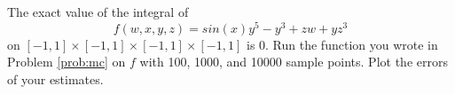 \begin{problem}
\label{prob:mc_test}
The exact value of the integral of
\[
f(w,x,y,z) = sin(x) y^5 -y^3 + zw + yz^3
\]
on $[-1,1]\times[-1,1]\times[-1,1]\times[-1,1]$ is 0.
Run the function  you wrote in Problem \ref{prob:mc} on $f$ with 100, 1000, and 10000 sample points.
Plot the errors of your estimates.
\end{problem}

